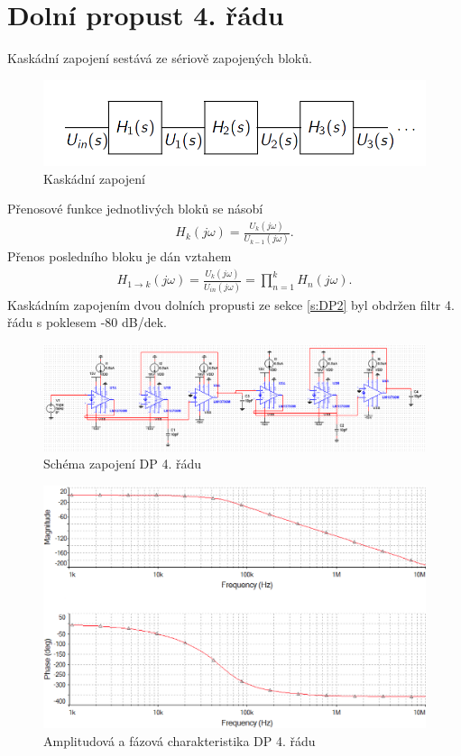 \documentclass[twoside]{article}
\begin{document}
\section{Dolní propust 4. řádu}\label{s:DP4}
Kaskádní zapojení sestává ze sériově zapojených bloků.
\begin{figure}[H]
\centering
\includegraphics[scale=0.4]{schemata.png}
\caption{Kaskádní zapojení \cite{4}}
\end{figure}
\noindent Přenosové funkce jednotlivých bloků se násobí
\begin{align}
H_k(j\omega) = \frac{U_k (j\omega)}{U_{k-1}(j\omega)}.
\end{align}
Přenos posledního bloku je dán vztahem
\begin{align}
H_{1 \rightarrow k}(j\omega) = \frac{U_k (j\omega)}{U_{in}(j\omega)} = \prod _{n=1}^{k} H_n(j\omega).
\end{align}
Kaskádním zapojením dvou dolních propusti ze sekce \ref{s:DP2} byl obdržen filtr 4. řádu s poklesem -80 dB/dek.
\begin{figure}[H]
\centering
\includegraphics[scale=0.5]{lpbp32.png}
\caption{Schéma zapojení DP 4. řádu}
\end{figure}\begin{figure}[H]
\centering
\includegraphics[scale=0.45]{bplp3.png}
\caption{Amplitudová a fázová charakteristika DP 4. řádu}
\end{figure}
\end{document}
